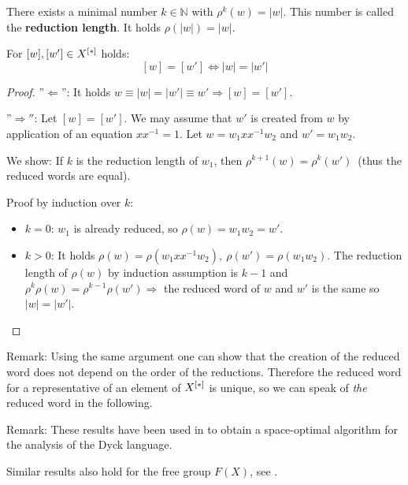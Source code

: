 \begin{lemma}
There exists a minimal number $k \in \mathbb{N}$ with $\rho^k(w) = |w|$. This
number is called the {\bf reduction length}. It holds $\rho(|w|) = |w|$.
\end{lemma}

\bigskip
\begin{lemma}
For $[w], [w'] \in \mbox{${X}^{[*]}$}$ holds:
\[ [w] = [w'] \iff |w| = |w'| \]
\end{lemma}

\begin{proof}
''$\Leftarrow$'': It holds $w \equiv |w| = |w'| \equiv w' \Rightarrow [w] =
[w']$.

''$\Rightarrow''$: Let $[w] = [w']$. We may assume that $w'$ is created from $w$
by application of an equation $x x^{-1} = 1$. Let $w = w_1 x x^{-1} w_2$ and $w' = w_1 w_2$.

We show: If $k$ is the reduction length of $w_1$, then $\rho^{k+1}(w) =
\rho^k(w')$\ (thus the reduced words are equal).

Proof by induction over $k$:
\begin{itemize}
  \item  $k = 0$: $w_1$ is already reduced, so $\rho(w) = w_1 w_2 = w'$.
  \item $k > 0$: It holds $\rho(w) = \rho(w_1 x x^{-1} w_2),\ \rho(w') = \rho(w_1
w_2)$. The reduction length of $\rho(w)$ by induction assumption is $k-1$ and
$\rho^k \rho(w) = \rho^{k-1}\rho(w') \Rightarrow$ the reduced word of $w$ and
$w'$ is the same so $|w| = |w'|$.
\end{itemize}
\end{proof}

Remark: Using the same argument one can show that the creation of the reduced
word does not depend on the order of the reductions. Therefore the reduced word
for a representative of an element of $\mbox{${X}^{[*]}$}$ is unique, so we can speak of {\em the} 
reduced word in the following.

Remark: These results have been used in \cite{HotzMesserschmidt} to obtain a
space-optimal algorithm for the analysis of the Dyck language.

Similar results also hold for the free group $F(X)$, see \cite{CrowellFox}.
